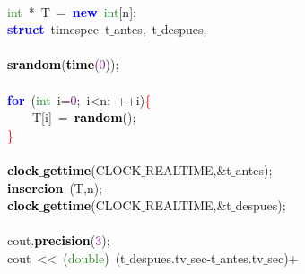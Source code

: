 \mbox{}\ \ \ \  \\
\mbox{}\ \ \ \ \textcolor{ForestGreen}{int}\ \textcolor{BrickRed}{*}\ T\ \textcolor{BrickRed}{=}\ \textbf{\textcolor{Blue}{new}}\ \textcolor{ForestGreen}{int}\textcolor{BrickRed}{[}n\textcolor{BrickRed}{];} \\
\mbox{}\ \ \ \ \textbf{\textcolor{Blue}{struct}}\ \textcolor{TealBlue}{timespec}\ t$\_$antes\textcolor{BrickRed}{,}\ t$\_$despues\textcolor{BrickRed}{;} \\
\mbox{}\ \ \ \  \\
\mbox{}\ \ \ \ \textbf{\textcolor{Black}{srandom}}\textcolor{BrickRed}{(}\textbf{\textcolor{Black}{time}}\textcolor{BrickRed}{(}\textcolor{Purple}{0}\textcolor{BrickRed}{));} \\
\mbox{}\ \ \ \  \\
\mbox{}\ \ \ \ \textbf{\textcolor{Blue}{for}}\ \textcolor{BrickRed}{(}\textcolor{ForestGreen}{int}\ i\textcolor{BrickRed}{=}\textcolor{Purple}{0}\textcolor{BrickRed}{;}\ i\textcolor{BrickRed}{\textless{}}n\textcolor{BrickRed}{;}\ \textcolor{BrickRed}{++}i\textcolor{BrickRed}{)}\textcolor{Red}{\{} \\
\mbox{}\ \ \ \ \ \ \ \ T\textcolor{BrickRed}{[}i\textcolor{BrickRed}{]}\ \textcolor{BrickRed}{=}\ \textbf{\textcolor{Black}{random}}\textcolor{BrickRed}{();} \\
\mbox{}\ \ \ \ \textcolor{Red}{\}} \\
\mbox{}\ \ \ \  \\
\mbox{}\ \ \ \ \textbf{\textcolor{Black}{clock$\_$gettime}}\textcolor{BrickRed}{(}CLOCK$\_$REALTIME\textcolor{BrickRed}{,\&}t$\_$antes\textcolor{BrickRed}{);} \\
\mbox{}\ \ \ \ \textbf{\textcolor{Black}{insercion}}\ \textcolor{BrickRed}{(}T\textcolor{BrickRed}{,}n\textcolor{BrickRed}{);} \\
\mbox{}\ \ \ \ \textbf{\textcolor{Black}{clock$\_$gettime}}\textcolor{BrickRed}{(}CLOCK$\_$REALTIME\textcolor{BrickRed}{,\&}t$\_$despues\textcolor{BrickRed}{);} \\
\mbox{}\ \ \ \  \\
\mbox{}\ \ \ \ cout\textcolor{BrickRed}{.}\textbf{\textcolor{Black}{precision}}\textcolor{BrickRed}{(}\textcolor{Purple}{3}\textcolor{BrickRed}{);} \\
\mbox{}\ \ \ \ cout\ \textcolor{BrickRed}{\textless{}\textless{}}\ \textcolor{BrickRed}{(}\textcolor{ForestGreen}{double}\textcolor{BrickRed}{)}\ \textcolor{BrickRed}{(}t$\_$despues\textcolor{BrickRed}{.}tv$\_$sec\textcolor{BrickRed}{-}t$\_$antes\textcolor{BrickRed}{.}tv$\_$sec\textcolor{BrickRed}{)+} \\
